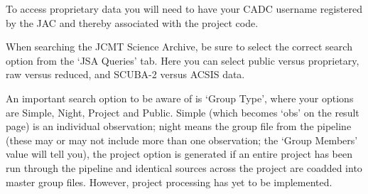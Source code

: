 \documentclass[twoside,11pt]{article}
\renewcommand{\_}{\texttt{\symbol{95}}}
\begin{document}
To access proprietary data you will need to have your CADC username
registered by the JAC and thereby associated with the project code.

When searching the JCMT Science Archive, be sure to select the correct
search option from the `JSA Queries' tab. Here you can select public
versus proprietary, raw versus reduced, and SCUBA-2 versus ACSIS data.

An important search option to be aware of is `Group Type', where your
options are Simple, Night, Project and Public. Simple (which becomes
`obs' on the result page) is an individual observation; night means
the group file from the pipeline (these may or may not include more
than one observation; the `Group Members' value will tell you), the
project option is generated if an entire project has been run through
the pipeline and identical sources across the project are coadded
into master group files.  However, project processing has yet to be
implemented.


\clearpage
\end{document}
